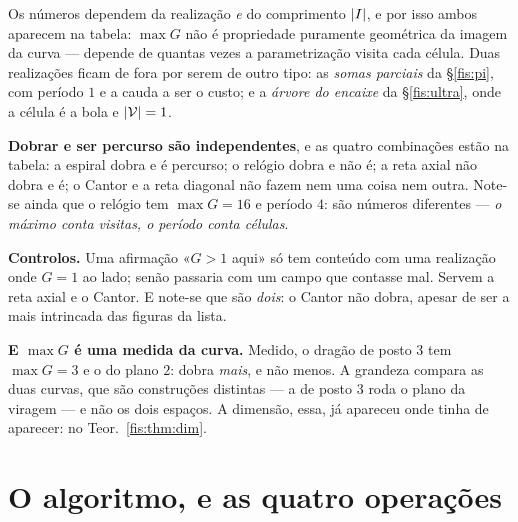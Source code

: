 \documentclass[livro.tex]{subfiles}
\begin{document}
\medskip\noindent Os números dependem da realização \emph{e} do comprimento
$\lvert I\rvert$, e por isso ambos aparecem na tabela: $\max G$ não é propriedade
puramente geométrica da imagem da curva --- depende de quantas vezes a
parametrização visita cada célula. Duas realizações ficam de fora por serem de
outro tipo: as \emph{somas parciais} da §\ref{fis:pi}, com período $1$ e a cauda
a ser o custo; e a \emph{árvore do encaixe} da §\ref{fis:ultra}, onde a célula é
a bola e $\lvert \mathcal{V}\rvert=1$.

\medskip\noindent\textbf{Dobrar e ser percurso são independentes}, e as quatro
combinações estão na tabela: a espiral dobra e é percurso; o relógio dobra e não
é; a reta axial não dobra e é; o Cantor e a reta diagonal não fazem nem uma coisa
nem outra. Note-se ainda que o relógio tem $\max G=16$ e período $4$: são números
diferentes --- \emph{o máximo conta visitas, o período conta células}.

\medskip\noindent\textbf{Controlos.} Uma afirmação «$G>1$ aqui» só tem conteúdo
com uma realização onde $G=1$ ao lado; senão passaria com um campo que
contasse mal. Servem a reta axial e o Cantor. E note-se que são \emph{dois}: o
Cantor não dobra, apesar de ser a mais intrincada das figuras da lista.

\medskip\noindent\textbf{E $\max G$ é uma medida da curva.} Medido, o dragão de
posto $3$ tem $\max G=3$ e o do plano $2$: dobra \emph{mais}, e não menos. A
grandeza compara as duas curvas, que são construções distintas --- a de posto $3$
roda o plano da viragem --- e não os dois espaços. A dimensão, essa, já apareceu
onde tinha de aparecer: no Teor.~\ref{fis:thm:dim}.


\section{O algoritmo, e as quatro operações}\label{fis:neuronio}
\end{document}
